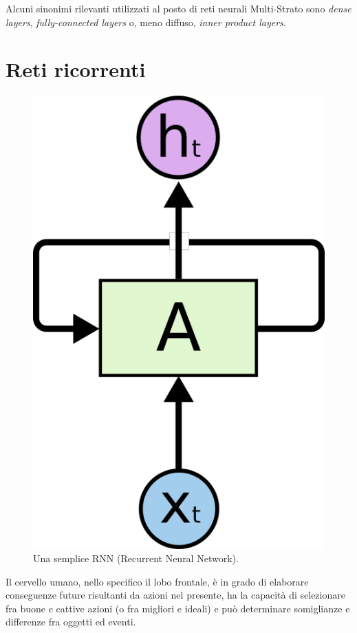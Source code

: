 Alcuni sinonimi rilevanti utilizzati al posto di reti neurali Multi-Strato 
sono \textit{dense layers}, \textit{fully-connected layers} o, meno diffuso, \textit{inner product layers}.
\section{Reti ricorrenti}
\label{sec:reti_ricorrenti}
\begin{figure}[ht]
	\centering
	\includegraphics{img/RNN.png}
	\caption{Una semplice RNN (Recurrent Neural Network).}
	\label{fig:1.4}
\end{figure}
Il cervello umano, nello specifico il lobo frontale, è in grado di elaborare conseguenze future risultanti da azioni nel presente, ha la capacità di selezionare fra buone e cattive azioni (o fra migliori e ideali) e può determinare somiglianze e differenze fra oggetti ed eventi.

